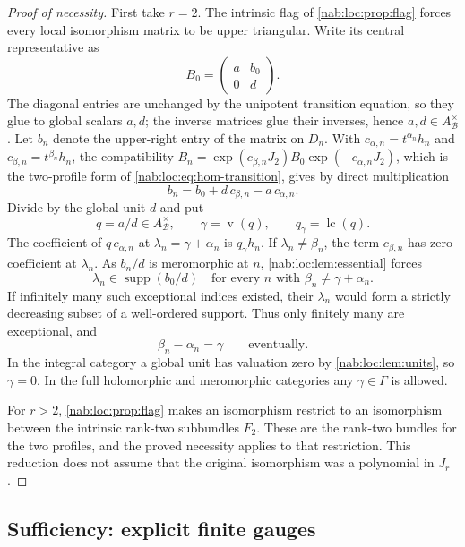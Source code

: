 \documentclass[11pt,letterpaper]{article}
\theoremstyle{definition}
\theoremstyle{remark}
\newcommand{\supp}{\operatorname{supp}}
\newcommand{\val}{\operatorname{v}}
\newcommand{\BB}{\mathscr B}
\newcommand{\Aglob}{A_{\BB}}
\newcommand{\lc}{\operatorname{lc}}
\numberwithin{equation}{section}
\begin{document}
\begin{proof}[Proof of necessity]
First take $r=2$. The intrinsic flag of \cref{nab:loc:prop:flag} forces every
local isomorphism matrix to be upper triangular. Write its central
representative as
\[
 B_0=\begin{pmatrix}a&b_0\\0&d\end{pmatrix}.
\]
The diagonal entries are unchanged by the unipotent transition equation, so
they glue to global scalars $a,d$; the inverse matrices glue their inverses,
hence $a,d\in\Aglob^\times$. Let $b_n$ denote the upper-right entry of the
matrix on $D_n$. With $c_{\alpha,n}=t^{\alpha_n}h_n$ and
$c_{\beta,n}=t^{\beta_n}h_n$, the compatibility
$B_n=\exp(c_{\beta,n}J_2)B_0\exp(-c_{\alpha,n}J_2)$, which is the two-profile
form of \eqref{nab:loc:eq:hom-transition}, gives by direct multiplication
\begin{equation}\label{nab:loc:eq:rank2-gauge}
 b_n=b_0+d\,c_{\beta,n}-a\,c_{\alpha,n}.
\end{equation}
Divide by the global unit $d$ and put
\[
 q=a/d\in\Aglob^\times,\qquad \gamma=\val(q),\qquad q_\gamma=\lc(q).
\]
The coefficient of $q\,c_{\alpha,n}$ at $\lambda_n=\gamma+\alpha_n$ is
$q_\gamma h_n$. If $\lambda_n\neq\beta_n$, the term $c_{\beta,n}$ has zero
coefficient at $\lambda_n$. As $b_n/d$ is meromorphic at $n$,
\cref{nab:loc:lem:essential} forces
\[
 \lambda_n\in\supp(b_0/d)
 \quad\text{for every }n\text{ with }\beta_n\neq\gamma+\alpha_n.
\]
If infinitely many such exceptional indices existed, their $\lambda_n$ would
form a strictly decreasing subset of a well-ordered support. Thus only finitely
many are exceptional, and
\[
 \beta_n-\alpha_n=\gamma\qquad\text{eventually}.
\]
In the integral category a global unit has valuation zero by
\cref{nab:loc:lem:units}, so $\gamma=0$. In the full holomorphic and
meromorphic categories any $\gamma\in\Gamma$ is allowed.

For $r>2$, \cref{nab:loc:prop:flag} makes an isomorphism restrict to an
isomorphism between the intrinsic rank-two subbundles $F_2$. These are the
rank-two bundles for the two profiles, and the proved necessity applies to that
restriction. This reduction does not assume that the original isomorphism was
a polynomial in $J_r$.
\end{proof}

\subsection{Sufficiency: explicit finite gauges}
\end{document}

